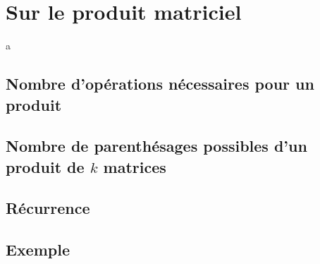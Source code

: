 
\section{Sur le produit matriciel}
a
\subsection{Nombre d'opérations nécessaires pour un produit}


\subsection{Nombre de parenthésages possibles d'un produit de $k$ matrices}


\subsection{Récurrence}


\subsection{Exemple}

